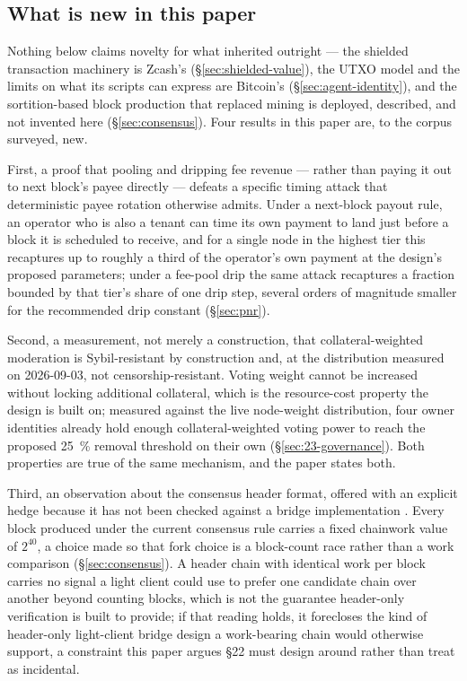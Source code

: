 \subsection{What is new in this paper}
\label{sec:intro-new}

Nothing below claims novelty for what \Flux inherited outright — the shielded transaction machinery
is Zcash's (\S\ref{sec:shielded-value}), the UTXO model and the limits on what its scripts can express
are Bitcoin's (\S\ref{sec:agent-identity}), and the sortition-based block production that replaced
mining is deployed, described, and not invented here (\S\ref{sec:consensus}). Four results in this
paper are, to the corpus surveyed, new.

First, a proof that pooling and dripping fee revenue — rather than paying it out to next block's
payee directly — defeats a specific timing attack that deterministic payee rotation otherwise admits.
Under a next-block payout rule, an operator who is also a tenant can time its own payment to land just
before a block it is scheduled to receive, and for a single node in the highest tier this recaptures
up to roughly a third of the operator's own payment at the design's proposed parameters; under a
fee-pool drip the same attack recaptures a fraction bounded by that tier's share of one drip step,
several orders of magnitude smaller for the recommended drip constant
\planned (\S\ref{sec:pnr}).

Second, a measurement, not merely a construction, that collateral-weighted moderation is
Sybil-resistant by construction and, at the distribution measured on 2026-09-03, not
censorship-resistant. Voting weight cannot be increased without locking additional collateral, which
is the resource-cost property the design is built on; measured against the live node-weight
distribution, four owner identities already hold enough collateral-weighted voting power to reach the
proposed \SI{25}{\percent} removal threshold on their own
\shipped {} (\S\ref{sec:23-governance}).
Both properties are true of the same mechanism, and the paper states both.

Third, an observation about the consensus header format, offered with an explicit hedge because it
has not been checked against a bridge implementation \srcinferred. Every block produced under the
current consensus rule carries a fixed chainwork value of $2^{40}$, a choice made so that fork choice
is a block-count race rather than a work comparison \shipped {}
(\S\ref{sec:consensus}). A header chain with identical work per block carries no signal a light
client could use to prefer one candidate chain over another beyond counting blocks, which is not the
guarantee header-only verification is built to provide; if that reading holds, it forecloses the kind
of header-only light-client bridge design a work-bearing chain would otherwise support, a constraint
this paper argues \S22 must design around rather than treat as incidental.


